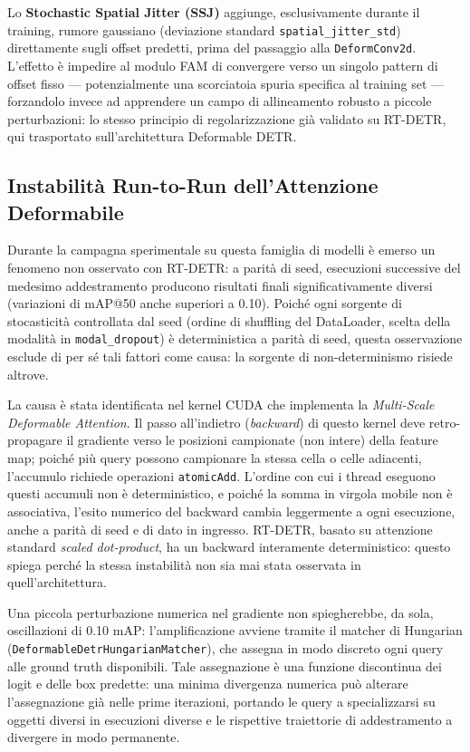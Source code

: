 \documentclass[a4paper,11pt]{article}
\begin{document}
Lo \textbf{Stochastic Spatial Jitter (SSJ)} aggiunge, esclusivamente durante il training, rumore gaussiano (deviazione standard \texttt{spatial\_jitter\_std}) direttamente sugli offset predetti, prima del passaggio alla \texttt{DeformConv2d}. L'effetto è impedire al modulo FAM di convergere verso un singolo pattern di offset fisso — potenzialmente una scorciatoia spuria specifica al training set — forzandolo invece ad apprendere un campo di allineamento robusto a piccole perturbazioni: lo stesso principio di regolarizzazione già validato su RT-DETR, qui trasportato sull'architettura Deformable DETR.

\subsection{Instabilità Run-to-Run dell'Attenzione Deformabile}
\label{sec:instabilita_deformable}

Durante la campagna sperimentale su questa famiglia di modelli è emerso un fenomeno non osservato con RT-DETR: a parità di seed, esecuzioni successive del medesimo addestramento producono risultati finali significativamente diversi (variazioni di mAP@50 anche superiori a 0.10). Poiché ogni sorgente di stocasticità controllata dal seed (ordine di shuffling del DataLoader, scelta della modalità in \texttt{modal\_dropout}) è deterministica a parità di seed, questa osservazione esclude di per sé tali fattori come causa: la sorgente di non-determinismo risiede altrove.

La causa è stata identificata nel kernel CUDA che implementa la \textit{Multi-Scale Deformable Attention}. Il passo all'indietro (\textit{backward}) di questo kernel deve retro-propagare il gradiente verso le posizioni campionate (non intere) della feature map; poiché più query possono campionare la stessa cella o celle adiacenti, l'accumulo richiede operazioni \texttt{atomicAdd}. L'ordine con cui i thread eseguono questi accumuli non è deterministico, e poiché la somma in virgola mobile non è associativa, l'esito numerico del backward cambia leggermente a ogni esecuzione, anche a parità di seed e di dato in ingresso. RT-DETR, basato su attenzione standard \textit{scaled dot-product}, ha un backward interamente deterministico: questo spiega perché la stessa instabilità non sia mai stata osservata in quell'architettura.

Una piccola perturbazione numerica nel gradiente non spiegherebbe, da sola, oscillazioni di 0.10 mAP: l'amplificazione avviene tramite il matcher di Hungarian (\texttt{DeformableDetrHungarianMatcher}), che assegna in modo discreto ogni query alle ground truth disponibili. Tale assegnazione è una funzione discontinua dei logit e delle box predette: una minima divergenza numerica può alterare l'assegnazione già nelle prime iterazioni, portando le query a specializzarsi su oggetti diversi in esecuzioni diverse e le rispettive traiettorie di addestramento a divergere in modo permanente.
\end{document}
